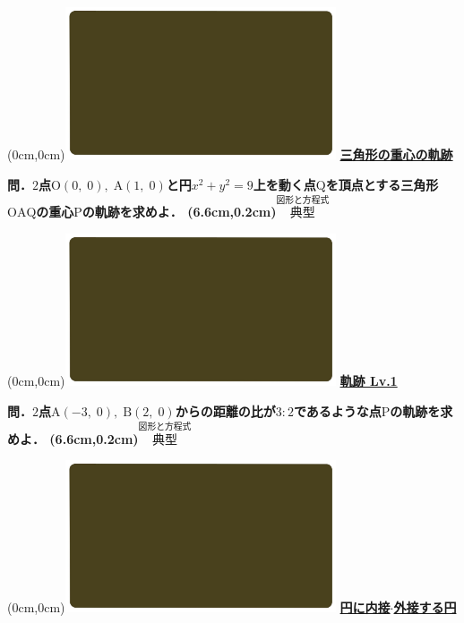 \documentclass[10pt,
fleqn,
dvipdfmx,
uplatex
]{jsarticle}
\begin{document}
\at(0cm,0cm){\includegraphics[width=8cm,bb=0 0 1920 1080]{./youtube/thumbnails/templates/smart_background/図形と方程式.jpeg}}
{\color{orange}\bf\boldmath\LARGE\underline{三角形の重心の軌跡}}\vspace{0.3zw}

\LARGE 
\bf\boldmath 問．$2$点$\text{O}\left(0,\;0\right),\;\text{A}\left(1,\;0\right)$と円$x^2+y^2=9$上を動く点$\text{Q}$を頂点とする三角形$\text{OAQ}$の重心$\text{P}$の軌跡を求めよ．
\at(6.6cm,0.2cm){\small\color{bradorange}$\overset{\text{図形と方程式}}{\text{典型}}$}


\newpage



\at(0cm,0cm){\includegraphics[width=8cm,bb=0 0 1920 1080]{./youtube/thumbnails/templates/smart_background/図形と方程式.jpeg}}
{\color{orange}\bf\boldmath\huge\underline{軌跡 Lv.1 }}\vspace{0.3zw}

\LARGE 
\bf\boldmath 問．$2$点$\text{A}\left(-3,\;0\right),\;\text{B}\left(2,\;0\right)$からの距離の比が$3:2$であるような点$\text{P}$の軌跡を求めよ．
\at(6.6cm,0.2cm){\small\color{bradorange}$\overset{\text{図形と方程式}}{\text{典型}}$}


\newpage



\at(0cm,0cm){\includegraphics[width=8cm,bb=0 0 1920 1080]{./youtube/thumbnails/templates/smart_background/図形と方程式.jpeg}}
{\color{orange}\bf\boldmath\LARGE\underline{円に内接$\cdot$外接する円}}\vspace{0.3zw}
\end{document}
